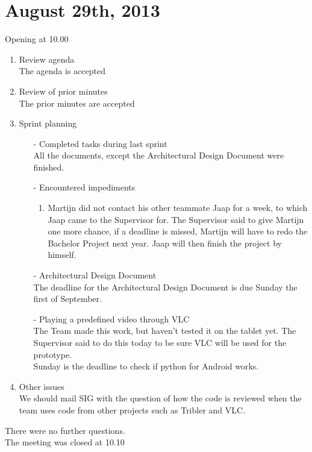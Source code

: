 \section{August 29th, 2013}

Opening at 10.00

\begin{enumerate}
\item Review agenda\\
The agenda is accepted		
\item Review of prior minutes\\
The prior minutes are accepted

\item Sprint planning

\begin{enumerate}
\item[-] Completed tasks during last sprint\\
All the documents, except the Architectural Design Document were finished.
\item[-] Encountered impediments\\
\begin{enumerate}
	\item Martijn did not contact his other teammate Jaap for a week, to which Jaap came to the Supervisor for. The Supervisor said to give Martijn one more chance, if a deadline is missed, Martijn will have to redo the Bachelor Project next year. Jaap will then finish the project by himself.
\end{enumerate}
\item[-] Architectural Design Document \\
The deadline for the Architectural Design Document is due Sunday the first of September.
\item[-] Playing a predefined video through VLC\\
The Team made this work, but haven't tested it on the tablet yet. The Supervisor said to do this today to be sure VLC will be used for the prototype.\\

Sunday is the deadline to check if python for Android works.\\
\end{enumerate}
\item Other issues\\
We should mail SIG with the question of how the code is reviewed when the team uses code from other projects such as Tribler and VLC.
\end{enumerate}

There were no further questions.\\

The meeting was closed at 10.10\\